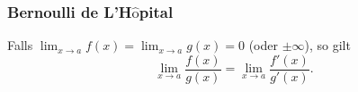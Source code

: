 \subsubsection{Bernoulli de L'H\texorpdfstring{$\hat{\textrm{o}}$}{o}pital}
    Falls $\displaystyle \lim_{x \to a} f(x) = \lim_{x \to a} g(x) = 0$ (oder $\pm \infty$), so gilt
    $$
         \lim_{x \to a} \frac{f(x)}{g(x)} = \lim_{x \to a} \frac{f'(x)}{g'(x)}.
    $$